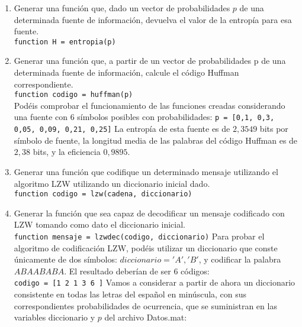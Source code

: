 \documentclass[es,practica]{uah}
\begin{document}
\begin{enumerate}
	\item Generar una función que, dado un vector de probabilidades $p$ de una determinada fuente de información, devuelva el valor de la entropía para esa fuente.\\
		\texttt{function H = entropia(p)}
	\item Generar una función que, a partir de un vector de probabilidades p de una determinada fuente de información, calcule el código Huffman correspondiente.\\
		\texttt{function codigo = huffman(p)}\\
	Podéis comprobar el funcionamiento de las funciones creadas considerando una fuente con 6 símbolos posibles con probabilidades:
		\texttt{p = [0,1, 0,3, 0,05, 0,09, 0,21, 0,25]}
		La entropía de esta fuente es de $2,3549$ bits por símbolo de fuente, la longitud media de las palabras del código Huffman es de $2,38$ bits, y la eficiencia $0,9895$.
	\item Generar una función que codifique un determinado mensaje utilizando el algoritmo LZW utilizando un diccionario inicial dado.\\
		\texttt{function codigo = lzw(cadena, diccionario)}
	\item Generar la función que sea capaz de decodificar un mensaje codificado con LZW tomando como dato el diccionario inicial.\\
		\texttt{function mensaje = lzwdec(codigo, diccionario)}
		Para probar el algoritmo de codificación LZW, podéis utilizar un diccionario que conste únicamente de dos símbolos: $diccionario = {'A','B'}$, y codificar la palabra $ABAABABA$. El resultado deberían de ser 6 códigos:\\
		\texttt{codigo = [1 2 1 3 6 ]}
	Vamos a considerar a partir de ahora un diccionario consistente en todas las letras del español en minúscula, con sus correspondientes probabilidades de ocurrencia, que se suministran en las variables diccionario y $p$ del archivo Datos.mat:	
	

\end{enumerate}
\end{document}
